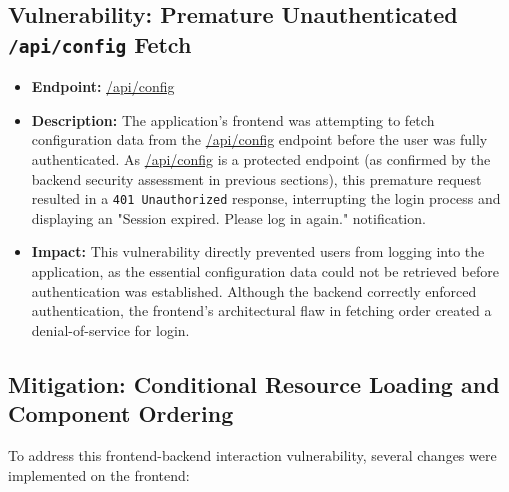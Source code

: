 \documentclass{article}
\begin{document}
\subsection{\texorpdfstring{\textbf{Vulnerability: Premature Unauthenticated \texttt{/api/config} Fetch}}{Vulnerability: Premature Unauthenticated /api/config Fetch}}
\begin{itemize}
    \item \textbf{Endpoint:} \url{/api/config}
    \item \textbf{Description:}
    The application's frontend was attempting to fetch configuration data from the \url{/api/config} endpoint before the user was fully authenticated. As \url{/api/config} is a protected endpoint (as confirmed by the backend security assessment in previous sections), this premature request resulted in a \texttt{401 Unauthorized} response, interrupting the login process and displaying an "Session expired. Please log in again." notification.
    \item \textbf{Impact:}
    This vulnerability directly prevented users from logging into the application, as the essential configuration data could not be retrieved before authentication was established. Although the backend correctly enforced authentication, the frontend's architectural flaw in fetching order created a denial-of-service for login.
\end{itemize}

\subsection{Mitigation: Conditional Resource Loading and Component Ordering}
To address this frontend-backend interaction vulnerability, several changes were implemented on the frontend:
\end{document}
